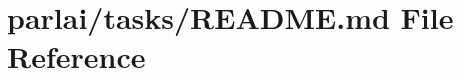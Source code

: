 \hypertarget{parlai_2tasks_2README_8md}{}\section{parlai/tasks/\+R\+E\+A\+D\+ME.md File Reference}
\label{parlai_2tasks_2README_8md}
